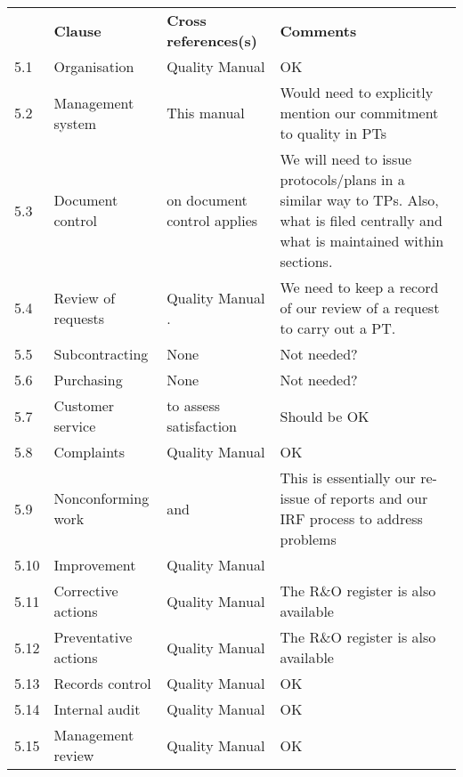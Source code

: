 \begin{center}
{\renewcommand*{\arraystretch}{1.4}
\begin{tabular}{p{1em}p{10em}p{12em}p{16em}}
	\rowcolor[rgb]{ 0,  0,  0} 
	\textcolor[rgb]{ 1,  1,  1}{} & 
	\textcolor[rgb]{ 1,  1,  1}{\textbf{Clause}} & 
	\textcolor[rgb]{ 1,  1,  1}{\textbf{Cross references(s)}} &
	\textcolor[rgb]{ 1,  1,  1}{\textbf{Comments}} \\
5.1	& Organisation	& Quality Manual  \cite[\S\ref*{QM-s:organisation}]{MSL_Quality_Manual} & OK \\
5.2	&Management system	&This manual	&Would need to explicitly mention our commitment to quality in PTs \\
5.3	&Document control	&\cite[\S\ref*{QM-s:documents_and_document_control}]{MSL_Quality_Manual} on document control applies	& We will need to issue protocols/plans in a similar way to TPs. Also, what is filed centrally and what is maintained within sections.\\
5.4	& Review of requests	& Quality Manual \cite[\S\ref*{QM-s:requests_and_tenders}]{MSL_Quality_Manual} . 
& We need to keep a record of our review of a request to carry out a PT.\\
5.5	& Subcontracting	& None	& Not needed? \\
5.6	& Purchasing	& None	& Not needed? \\
5.7	& Customer service	& \cite[\S\ref*{QM-ss:client_satisfaction}]{MSL_Quality_Manual} to assess satisfaction	& Should be OK \\
5.8	& Complaints	& Quality Manual  \cite[\S\ref*{QM-ss:complaints}]{MSL_Quality_Manual} & OK\\

5.9	& Nonconforming work	& \cite[\S\ref*{QM-ss:metrological_reports}]{MSL_Quality_Manual} and \cite[\S\ref*{QM-ss:improvement_requests}]{MSL_Quality_Manual} &
This is essentially our re-issue of reports and our IRF process to address problems \\
5.10	& Improvement	& Quality Manual  \cite[\S\ref*{QM-s:improvements}]{MSL_Quality_Manual}  \\
5.11	&Corrective actions	& Quality Manual  \cite[\S\ref*{QM-ss:improvement_requests}]{MSL_Quality_Manual} & The R\&O register is also available \\
5.12	& Preventative actions	& Quality Manual  \cite[\S\ref*{QM-ss:improvement_requests}]{MSL_Quality_Manual} & The R\&O register is also available \\
5.13	& Records control	& Quality Manual  \cite[\S\ref*{QM-s:documents_and_document_control}]{MSL_Quality_Manual} & OK\\
5.14	& Internal audit	& Quality Manual  \cite[\S\ref*{QM-ss:internal_audit}]{MSL_Quality_Manual} & OK \\
5.15	& Management review	& Quality Manual  \cite[\S\ref*{QM-ss:management_review}]{MSL_Quality_Manual} & OK \\	
\end{tabular} } 
\end{center}

